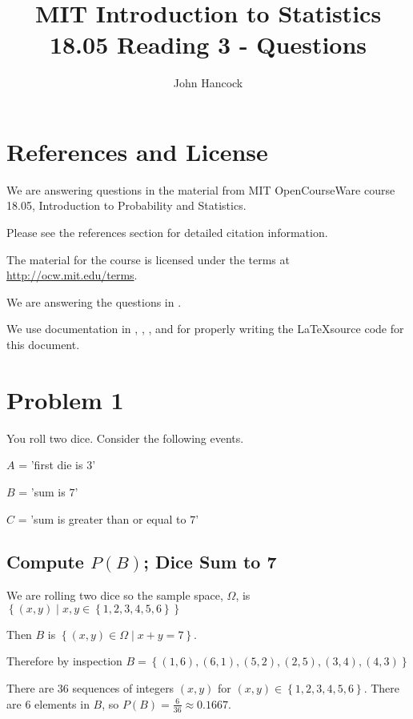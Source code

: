 \documentclass[a4paper,11pt]{article}
\author{John Hancock}
\title{MIT Introduction to Statistics 18.05 Reading 3 - Questions }
\begin{document}
\maketitle
\tableofcontents
\section{References and License}
We are answering questions in the material from MIT OpenCourseWare
course 18.05, Introduction to Probability and Statistics.

Please see the references section for detailed citation information.

The material for the course is licensed under the terms at 
\url{http://ocw.mit.edu/terms}.

We are answering the questions in \cite{reading3Questions}.

We use documentation in \cite{latexSymbols}, \cite{latexMultiLine},
\cite{latexBold}, and \cite{latexForLatex} for properly writing the
\LaTeX source code for this document.
 
\label{prob1}
\section{Problem 1}
You roll two dice. Consider the following events. 

$A$ = 'first die is $3$'

$B$ = 'sum is $7$' 

$C$ = 'sum is greater than or equal to $7$'

\subsection{Compute $P\left(B\right)$; Dice Sum to 7}

We are rolling two dice so the sample space, $\Omega$, is 
$\left\{ \left( x,y \right) 
  \mid x, y \in \left\{ 1,2,3,4,5,6 \right\} \right\}$

Then $B$ is $ \left\{ \left( x, y \right) \in \Omega 
  \mid x + y = 7 \right\}$.

Therefore by inspection $B = \left\{ \left(1, 6 \right), 
  \left(6, 1 \right),
  \left(5, 2 \right),
  \left(2, 5 \right),
  \left(3, 4 \right),
  \left(4, 3 \right)
  \right\}$
  
There are $36$ sequences of integers $\left(x, y \right)$ for
$\left( x, y \right) \in \left\{1, 2, 3, 4, 5, 6 \right\}$.  There are $6$ elements
in $B$, so $P\left( B \right) = \frac{6}{36} \approx 0.1667$.
\end{document}
